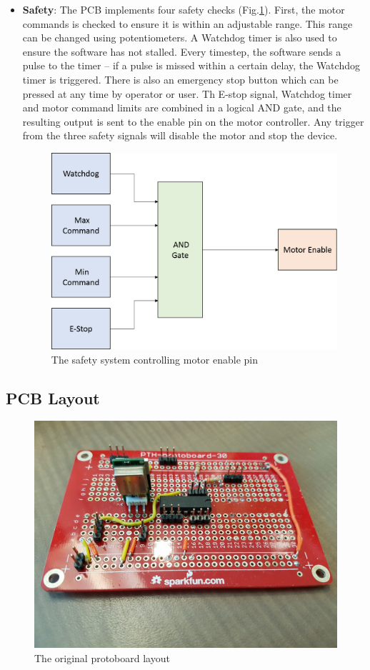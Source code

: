 \documentclass[12pt]{report}
\begin{document}
\begin{itemize}
	\item \textbf{Safety}: The PCB implements four safety checks (Fig.\ref{fig:safety}). First, the motor commands is checked to ensure it is within an adjustable range. This range can be changed using potentiometers. A Watchdog timer is also used to ensure the software has not stalled. Every timestep, the software sends a pulse to the timer -- if a pulse is missed within a certain delay, the Watchdog timer is triggered. There is also an emergency stop button which can be pressed at any time by operator or user. Th E-stop signal, Watchdog timer and motor command limits are combined in a logical AND gate, and the resulting output is sent to the enable pin on the motor controller. Any trigger from the three safety signals will disable the motor and stop the device.

	\begin{figure}[h] 
		\centering
		\includegraphics[width=0.6\linewidth]{electronics_safety}
		\caption{The safety system controlling motor enable pin}
		\label{fig:safety}
	\end{figure}	
	 
	\end{itemize}

		
		\subsection{PCB Layout}
		
	\begin{figure}[p] 
		\centering
		\includegraphics[width=0.5\linewidth]{protoboard2}
		\caption{The original protoboard layout}
		\label{fig:protoboard}
	\end{figure}		
	
\end{document}
